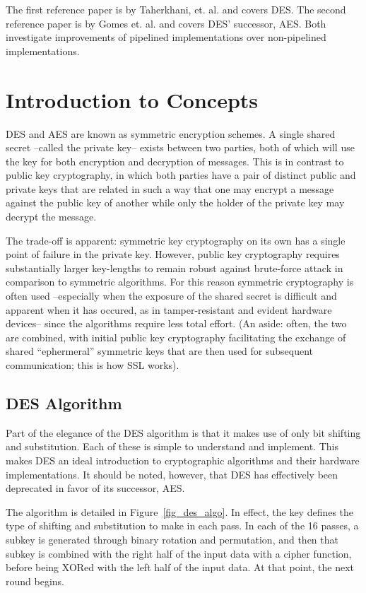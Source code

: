 \documentclass[journal,twocolumn]{IEEEtran}
\begin{document}
The first reference paper is by Taherkhani, et. al.\cite{5577878} and covers 
DES. The second reference paper is by Gomes et. al.\cite{6078888} and covers
DES' successor, AES. Both investigate improvements of pipelined implementations
over non-pipelined implementations.

\section{Introduction to Concepts}

 DES and AES are known as symmetric encryption schemes. A
single shared secret --called the private key-- exists between two parties,
both of which will use the key for both encryption and decryption of messages.
This is in contrast to public key cryptography, in which both parties have a
pair of distinct public and private keys that are related in such a way that
one may encrypt a message against the public key of another while only the
holder of the private key may decrypt the message.

The trade-off is apparent: symmetric key cryptography on its own has a single 
point of failure in the private key. However, public key cryptography 
requires substantially larger key-lengths to remain robust against brute-force 
attack in comparison to symmetric algorithms. For this reason symmetric 
cryptography is often used --especially when the exposure of the shared secret
is difficult and apparent when it has occured, as in tamper-resistant and
evident hardware devices-- since the algorithms require less total effort. 
(An aside: often, the two are combined, with initial public key cryptography 
facilitating the exchange of shared ``ephermeral'' symmetric keys that are 
then used for subsequent communication; this is how SSL works).

\subsection{DES Algorithm}

Part of the elegance of the DES algorithm is that it makes use of only 
bit shifting and substitution. Each of these is simple to understand and 
implement. This makes DES an ideal introduction to cryptographic algorithms 
and their hardware implementations. It should be noted, however, that DES has 
effectively been deprecated in favor of its successor, AES.

The algorithm is detailed in Figure~\ref{fig_des_algo}. In effect, the key 
defines the type of shifting and substitution to make in each pass. In each 
of the 16 passes, a subkey is generated through binary rotation and 
permutation, and then that subkey is combined with the right half of the 
input data with a cipher function, before being XORed with the left 
half of the input data. At that point, the next round begins. 
\end{document}
